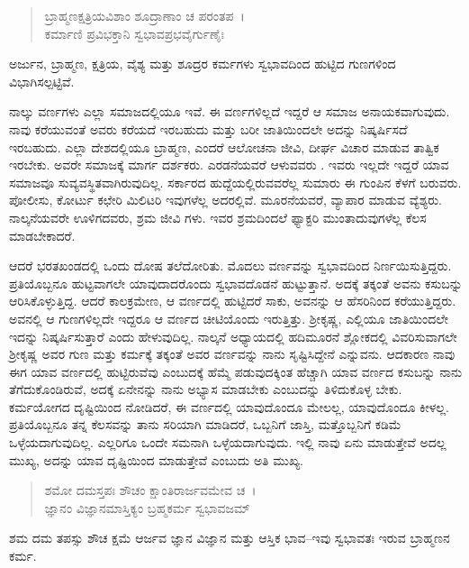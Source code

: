 \begin{verse}
ಬ್ರಾಹ್ಮಣಕ್ಷತ್ರಿಯವಿಶಾಂ ಶೂದ್ರಾಣಾಂ ಚ ಪರಂತಪ~।\\ಕರ್ಮಾಣಿ ಪ್ರವಿಭಕ್ತಾನಿ ಸ್ವಭಾವಪ್ರಭವೈರ್ಗುಣೈಃ 
\end{verse}

{\small ಅರ್ಜುನ, ಬ್ರಾಹ್ಮಣ, ಕ್ಷತ್ರಿಯ, ವೈಶ್ಯ ಮತ್ತು ಶೂದ್ರರ ಕರ್ಮಗಳು ಸ್ವಭಾವದಿಂದ ಹುಟ್ಟಿದ ಗುಣಗಳಿಂದ ವಿಭಾಗಿಸಲ್ಪಟ್ಟಿವೆ.}

ನಾಲ್ಕು ವರ್ಣಗಳು ಎಲ್ಲಾ ಸಮಾಜದಲ್ಲಿಯೂ ಇವೆ. ಈ ವರ್ಣಗಳಿಲ್ಲದೆ ಇದ್ದರೆ ಆ ಸಮಾಜ ಅನಾಯಕವಾಗುವುದು. ನಾವು ಕರೆಯುವಂತೆ ಅವರು ಕರೆಯದೆ ಇರಬಹುದು ಮತ್ತು ಬರೀ ಜಾತಿಯಿಂದಲೇ ಅದನ್ನು ನಿಷ್ಕರ್ಷಿಸದೆ ಇರಬಹುದು. ಎಲ್ಲಾ ದೇಶದಲ್ಲಿಯೂ ಬ್ರಾಹ್ಮಣ, ಎಂದರೆ ಆಲೋಚನಾ ಜೀವಿ, ದೀರ್ಘ ವಿಚಾರ ಮಾಡುವ ತಾತ್ವಿಕ ಇರಬೇಕು. ಅವರೇ ಸಮಾಜಕ್ಕೆ ಮಾರ್ಗ ದರ್ಶಕರು. ಎರಡನೆಯವರೆ ಆಳುವವರು . ಇವರು ಇಲ್ಲದೇ ಇದ್ದರೆ ಯಾವ ಸಮಾಜವೂ ಸುವ್ಯವಸ್ಥಿತವಾಗಿರುವುದಿಲ್ಲ. ಸರ್ಕಾರದ ಹುದ್ದೆಯಲ್ಲಿರುವವರೆಲ್ಲ ಸುಮಾರು ಈ ಗುಂಪಿನ ಕೆಳಗೆ ಬರುವರು. ಪೋಲೀಸು, ಕೋರ್ಟು ಕಛೇರಿ ಮಿಲಿಟರಿ ಇವುಗಳೆಲ್ಲ ಅದರಲ್ಲಿವೆ. ಮೂರನೆಯವರೆ, ವ್ಯಾಪಾರ ಮಾಡುವ ವ್ಯೆಶ್ಯರು. ನಾಲ್ಕನೆಯವರೇ ಊಳಿಗದವರು, ಶ್ರಮ ಜೀವಿ ಗಳು. ಇವರ ಶ್ರಮದಿಂದಲೆ ಫ್ಯಾಕ್ಟರಿ ಮುಂತಾದುವುಗಳೆಲ್ಲ ಕೆಲಸ ಮಾಡಬೇಕಾದರೆ.

ಆದರೆ ಭರತಖಂಡದಲ್ಲಿ ಒಂದು ದೋಷ ತಲೆದೋರಿತು. ಮೊದಲು ವರ್ಣವನ್ನು ಸ್ವಭಾವದಿಂದ ನಿರ್ಣಯಿಸುತ್ತಿದ್ದರು. ಪ್ರತಿಯೊಬ್ಬನೂ ಹುಟ್ಟವಾಗಲೇ ಯಾವುದಾದರೊಂದು ಸ್ವಭಾವದೊಡನೆ ಹುಟ್ಟುತ್ತಾನೆ. ಅದಕ್ಕೆ ತಕ್ಕಂತೆ ಅವನು ಕಸುಬನ್ನು ಆರಿಸಿಕೊಳ್ಳುತ್ತಿದ್ದ. ಆದರೆ ಕಾಲಕ್ರಮೇಣ, ಆ ವರ್ಣದಲ್ಲಿ ಹುಟ್ಟಿದರೆ ಸಾಕು, ಅವನನ್ನು ಆ ಹೆಸರಿನಿಂದ ಕರೆಯುತ್ತಿದ್ದರು. ಅವನಲ್ಲಿ ಆ ಗುಣಗಳಿಲ್ಲದೇ ಇದ್ದರೂ ಆ ವರ್ಣದ ಚೀಟಿಯೊಂದು ಇರುತ್ತಿತ್ತು. ಶ‍್ರೀಕೃಷ್ಣ, ಎಲ್ಲಿಯೂ ಜಾತಿಯಿಂದಲೇ ಇದನ್ನು ನಿಷ್ಕರ್ಷಿಸುತ್ತಾರೆ ಎಂದು ಹೇಳುವುದಿಲ್ಲ. ನಾಲ್ಕನೆ ಅಧ್ಯಾಯದಲ್ಲಿ ಹದಿಮೂರನೆ ಶ್ಲೋಕದಲ್ಲಿ ವಿವರಿಸುವಾಗಲೇ ಶ‍್ರೀಕೃಷ್ಣ ಅವರ ಗುಣ ಮತ್ತು ಕರ್ಮಕ್ಕೆ ತಕ್ಕಂತೆ ಅವರ ವರ್ಣವನ್ನು ನಾನು ಸೃಷ್ಟಿಸಿದ್ದೇನೆ ಎನ್ನುವನು. ಆದಕಾರಣ ನಾವು ಈಗ ಯಾವ ವರ್ಣದಲ್ಲಿ ಹುಟ್ಟಿರುವೆವು ಎಂಬುದಕ್ಕೆ ಹೆಮ್ಮೆ ಪಡುವುದಕ್ಕಿಂತ ಹೆಚ್ಚಾಗಿ ಯಾವ ವರ್ಣದ ಕಸುಬನ್ನು ನಾನು ತೆಗೆದುಕೊಂಡಿರುವೆ, ಅದಕ್ಕೆ ಏನೇನನ್ನು ನಾನು ಅಭ್ಯಾಸ ಮಾಡಬೇಕು ಎಂಬುದನ್ನು ತಿಳಿದುಕೊಳ್ಳ ಬೇಕು. ಕರ್ಮಯೋಗದ ದೃಷ್ಟಿಯಿಂದ ನೋಡಿದರೆ, ಈ ವರ್ಣದಲ್ಲಿ ಯಾವುದೊಂದೂ ಮೇಲಲ್ಲ, ಯಾವುದೊಂದೂ ಕೀಳಲ್ಲ. ಪ್ರತಿಯೊಬ್ಬನೂ ತನ್ನ ಕೆಲಸವನ್ನು ತಾನು ಸರಿಯಾಗಿ ಮಾಡಿದರೆ, ಒಬ್ಬನಿಗೆ ಜಾಸ್ತಿ, ಮತ್ತೊಬ್ಬನಿಗೆ ಕಡಿಮೆ ಒಳ್ಳೆಯದಾಗುವುದಿಲ್ಲ. ಎಲ್ಲರಿಗೂ ಒಂದೇ ಸಮನಾಗಿ ಒಳ್ಳೆಯದಾಗುವುದು. ಇಲ್ಲಿ ನಾವು ಏನು ಮಾಡುತ್ತೇವೆ ಅದಲ್ಲ ಮುಖ್ಯ, ಅದನ್ನು ಯಾವ ದೃಷ್ಟಿಯಿಂದ ಮಾಡುತ್ತೇವೆ ಎಂಬುದು ಅತಿ ಮುಖ್ಯ.

\begin{verse}
ಶಮೋ ದಮಸ್ತಪಃ ಶೌಚಂ ಕ್ಷಾಂತಿರಾರ್ಜವಮೇವ ಚ~।\\ಜ್ಞಾನಂ ವಿಜ್ಞಾನಮಾಸ್ತಿಕ್ಯಂ ಬ್ರಹ್ಮಕರ್ಮ ಸ್ವಭಾವಜಮ್ 
\end{verse}

{\small ಶಮ ದಮ ತಪಸ್ಸು ಶೌಚ ಕ್ಷಮೆ ಆರ್ಜವ ಜ್ಞಾನ ವಿಜ್ಞಾನ ಮತ್ತು ಆಸ್ತಿಕ ಭಾವ--ಇವು ಸ್ವಭಾವತಃ ಇರುವ ಬ್ರಾಹ್ಮಣನ ಕರ್ಮ.}


